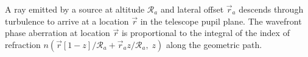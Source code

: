 A ray emitted by a source at altitude $\mathcal{R}_{a}$ and lateral offset $\vec{r}_{a}$ descends through turbulence to arrive at a location $\vec{r}$ in the telescope pupil plane.  The wavefront phase aberration at location $\vec{r}$ is proportional to the integral of the index of refraction $n \left( \vec{r}\left[1-z\right]/\mathcal{R}_{a} + \vec{r}_{a} z/\mathcal{R}_{a}, \; z\right)$ 
along the geometric path. 
\label{fig:r_vector_schematic}
